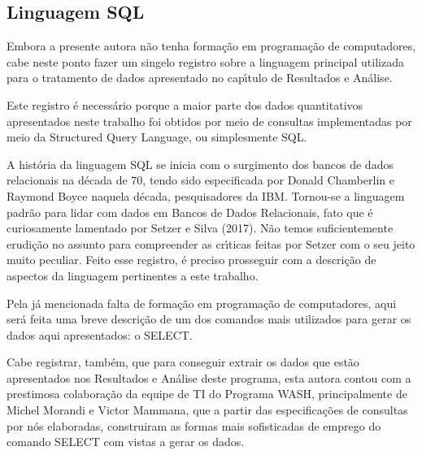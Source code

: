 \documentclass[
12pt,		%
openright,	%
twoside,  %
a4paper,			%
chapter=TITLE,		%
english,			%
french,				%
spanish,			%
brazil				%
]{USPSC-classe/USPSC}
\begin{document}
\subsection[Linguagem SQL]{Linguagem SQL}\label{Linguagem SQL}
Embora a presente autora n\~ao tenha forma\c{c}\~ao em programa\c{c}\~ao de computadores, cabe neste ponto fazer um singelo registro sobre a linguagem principal utilizada para o tratamento de dados apresentado no cap\'{\i}tulo de \textquotedbl Resultados e An\'alise\textquotedbl .








Este registro \'e necess\'ario porque a maior parte dos dados quantitativos apresentados neste trabalho foi obtidos por meio de consultas implementadas por meio da Structured Query Language, ou simplesmente SQL.








A hist\'oria da linguagem SQL se inicia com o surgimento dos bancos de dados relacionais na d\'ecada de 70, tendo sido  especificada por Donald Chamberlin e Raymond Boyce naquela d\'ecada, pesquisadores da IBM. Tornou-se a linguagem padr\~ao para lidar com dados em Bancos de Dados Relacionais, fato que \'e curiosamente lamentado por  Setzer e Silva (2017). N\~ao temos suficientemente erudi\c{c}\~ao no assunto para compreender as cr\'{\i}ticas feitas por Setzer com o seu jeito muito peculiar. Feito esse registro, \'e preciso prosseguir com a descri\c{c}\~ao de aspectos da linguagem pertinentes a este trabalho.








Pela j\'a mencionada falta de forma\c{c}\~ao em programa\c{c}\~ao de computadores, aqui ser\'a feita uma breve descri\c{c}\~ao de um dos comandos mais utilizados para gerar os dados aqui apresentados: o SELECT.








Cabe registrar, tamb\'em, que para conseguir extrair os dados que est\~ao apresentados nos Resultados e An\'alise deste programa, esta autora contou com a prestimosa colabora\c{c}\~ao da equipe de TI do Programa WASH, principalmente de Michel Morandi e Victor Mammana, que a partir das especifica\c{c}\~oes de consultas por n\'os elaboradas, construiram as formas mais sofisticadas de emprego do comando SELECT com vistas a gerar os dados.
\end{document}
